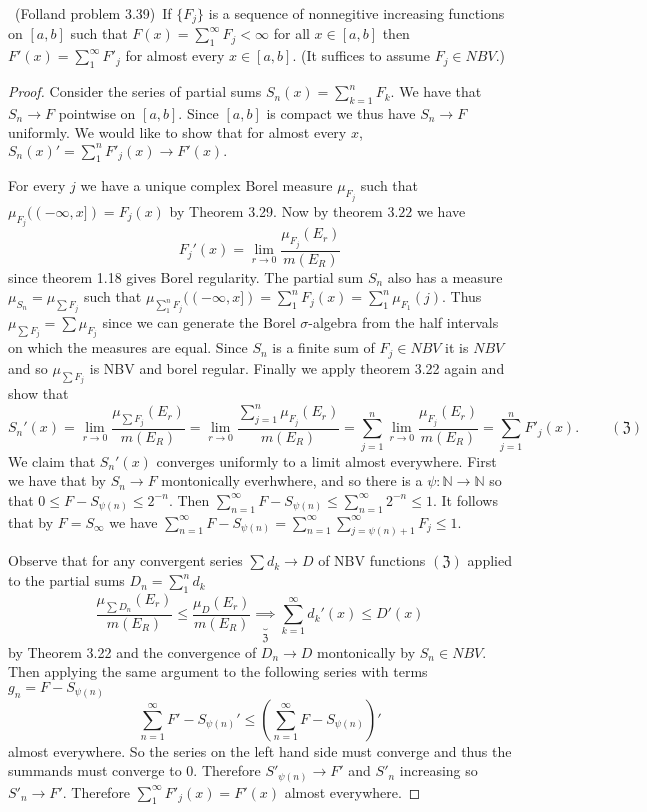 \documentclass[11pt]{amsart}
\theoremstyle{definition}
\numberwithin{theorem}{section}
\numberwithin{definition}{section}
\numberwithin{equation}{section}
\begin{document}
\medskip {}\ (Folland problem 3.39)\ If $\{F_j\}$ is a sequence of nonnegitive increasing functions
on $[a,b]$ such that $F(x) = \sum_{1}^\infty F_j < \infty$ for all $x \in [a,b]$ then $F'(x) = \sum_{1}^\infty F'_j$ for almost
every $x \in [a,b]$. (It suffices to assume $F_j \in NBV$.)
\begin{proof}
	Consider the series of partial sums $S_n(x) = \sum_{k=1}^n F_k$. We have that $S_n \to F$ pointwise on $[a,b]$. Since $[a,b]$ is
	compact we thus have $S_n \to F$ uniformly. We would like to show that for almost every $x$,  $S_n(x)' = \sum_1^n F'_j(x) \to F'(x).$ 

	For every $j$ we have a unique complex Borel measure $\mu_{F_j}$ such that $\mu_{F_j}((-\infty, x]) = F_j(x)$ by Theorem 3.29. Now by theorem $3.22$ we have $$F_j'(x) = \lim_{r \to 0}\frac{\mu_{F_j}(E_r)}{m(E_R)}$$ since theorem 1.18 gives Borel regularity. The partial sum $S_n$ also has a measure $\mu_{S_n} = \mu_{\sum F_j}$ such that $ \mu_{\sum_1^n F_j}((-\infty, x]) = \sum_1^n F_j(x) = \sum_1^n \mu_{F_1}(j).$
	Thus $ \mu_{\sum F_j} = \sum \mu_{F_j}$ since we can generate the Borel $\sigma$-algebra from the half intervals on which the measures are equal. Since $S_n$ is a finite sum of $F_j \in NBV$ it is $NBV$ and so $ \mu_{\sum F_j}$ is NBV and borel regular. Finally we apply theorem 3.22 again and show that
	\begin{equation*}
		S_n'(x) = \lim_{r \to 0}\frac{\mu_{ \sum F_j}(E_r)}{m(E_R)} = \lim_{r \to 0}\frac{\sum_{j=1}^n \mu_{  F_j}(E_r)}{m(E_R)} = \sum_{j=1}^n  \lim_{r \to 0} \frac{\mu_{  F_j}(E_r)}{m(E_R)} = \sum_{j=1}^n F'_j(x). \;\;\;\;\;\;\;\;(\mathfrak{Z})
	\end{equation*}
	We claim that $S_n'(x)$ converges uniformly to a limit almost everywhere. First we have that by $S_n \to F$ montonically everhwhere, and so there is a $\psi: \mathbb{N} \to \mathbb{N}$ so that
	$0 \leq F - S_{\psi(n)} \leq 2^{-n}.$ Then $\sum_{n=1}^\infty F - S_{\psi(n)} \leq \sum_{n=1}^\infty 2^{-n} \leq 1.$  It follows that by 
	$F = S_\infty$ we have $\sum_{n=1}^\infty F - S_{\psi(n)} = \sum_{n=1}^\infty \sum_{j=\psi(n)+1}^\infty F_j \leq 1$. 

	Observe that for any convergent series $\sum d_k \to D$ of NBV functions $(\mathfrak{Z})$ applied to the partial sums $D_n = \sum_1^n d_k$
	$$\frac{\mu_{ \sum D_n}(E_r)}{m(E_R)} \leq \frac{\mu_{D}(E_r)}{m(E_R)} \underbrace{\implies}_\mathfrak{Z} \sum_{k=1}^\infty d_k'(x) \leq  D'(x) $$ 
	by Theorem 3.22 and the convergence of $D_n \to D$ montonically by $S_n \in NBV.$ Then applying the same argument
	to the following series with  terms $g_n = F - S_{\psi(n)}$
	\begin{equation*}
		\sum_{n=1}^\infty F' - S_{\psi(n)}'  \leq \left(\sum_{n=1}^\infty F - S_{\psi(n)}\right)' 
	\end{equation*}
	almost everywhere. So the series on the left hand side must converge and thus the summands must converge to $0$. Therefore $S'_{\psi(n)} \to F'$ and $S'_n$ increasing so $S'_n \to F'$. Therefore $\sum_{1}^\infty F'_j(x) = F'(x)$ almost everywhere.

\end{proof}
\end{document}
